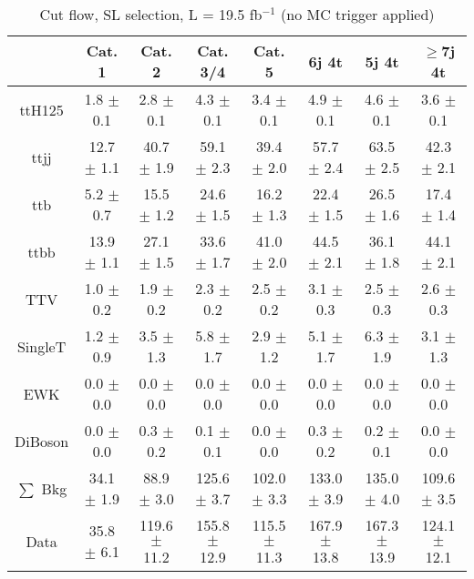 \documentclass{article}
\begin{document}
        \begin{table*}[htbp]
        \begin{center}
\label{tab:cutflow}
\begin{tabular}{| c| c| c| c| c| c| c| c| }
\hline
 & Cat. 1  & Cat. 2  & Cat. 3/4  & Cat. 5  & 6j 4t  & 5j 4t  & $\ge$7j 4t \\ \hline
ttH125 &  1.8 $\pm$ 0.1  &  2.8 $\pm$ 0.1  &  4.3 $\pm$ 0.1  &  3.4 $\pm$ 0.1  &  4.9 $\pm$ 0.1  &  4.6 $\pm$ 0.1  &  3.6 $\pm$ 0.1 \\
ttjj &  12.7 $\pm$ 1.1  &  40.7 $\pm$ 1.9  &  59.1 $\pm$ 2.3  &  39.4 $\pm$ 2.0  &  57.7 $\pm$ 2.4  &  63.5 $\pm$ 2.5  &  42.3 $\pm$ 2.1 \\
ttb &  5.2 $\pm$ 0.7  &  15.5 $\pm$ 1.2  &  24.6 $\pm$ 1.5  &  16.2 $\pm$ 1.3  &  22.4 $\pm$ 1.5  &  26.5 $\pm$ 1.6  &  17.4 $\pm$ 1.4 \\
ttbb &  13.9 $\pm$ 1.1  &  27.1 $\pm$ 1.5  &  33.6 $\pm$ 1.7  &  41.0 $\pm$ 2.0  &  44.5 $\pm$ 2.1  &  36.1 $\pm$ 1.8  &  44.1 $\pm$ 2.1 \\
TTV &  1.0 $\pm$ 0.2  &  1.9 $\pm$ 0.2  &  2.3 $\pm$ 0.2  &  2.5 $\pm$ 0.2  &  3.1 $\pm$ 0.3  &  2.5 $\pm$ 0.3  &  2.6 $\pm$ 0.3 \\
SingleT &  1.2 $\pm$ 0.9  &  3.5 $\pm$ 1.3  &  5.8 $\pm$ 1.7  &  2.9 $\pm$ 1.2  &  5.1 $\pm$ 1.7  &  6.3 $\pm$ 1.9  &  3.1 $\pm$ 1.3 \\
EWK &  0.0 $\pm$ 0.0  &  0.0 $\pm$ 0.0  &  0.0 $\pm$ 0.0  &  0.0 $\pm$ 0.0  &  0.0 $\pm$ 0.0  &  0.0 $\pm$ 0.0  &  0.0 $\pm$ 0.0 \\
DiBoson &  0.0 $\pm$ 0.0  &  0.3 $\pm$ 0.2  &  0.1 $\pm$ 0.1  &  0.0 $\pm$ 0.0  &  0.3 $\pm$ 0.2  &  0.2 $\pm$ 0.1  &  0.0 $\pm$ 0.0 \\
\hline
$\sum$ Bkg &  34.1 $\pm$ 1.9  &  88.9 $\pm$ 3.0  &  125.6 $\pm$ 3.7  &  102.0 $\pm$ 3.3  &  133.0 $\pm$ 3.9  &  135.0 $\pm$ 4.0  &  109.6 $\pm$ 3.5 \\
\hline
Data &  35.8 $\pm$ 6.1  &  119.6 $\pm$ 11.2  &  155.8 $\pm$ 12.9  &  115.5 $\pm$ 11.3  &  167.9 $\pm$ 13.8  &  167.3 $\pm$ 13.9  &  124.1 $\pm$ 12.1 \\
\hline

        \end{tabular}

\caption{Cut flow, SL selection,   L = 19.5 fb$^{-1}$  (no MC trigger applied)  }
   
     \end{center}
        \end{table*}

        
\end{document}
